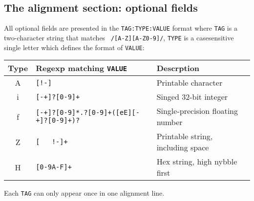 \documentclass[10pt]{article}
\begin{document}
\subsection{The alignment section: optional fields}
All optional fields are presented in the {\tt TAG:TYPE:VALUE} format
where {\tt TAG} is a two-character string that matches {\tt
  /[A-Z][A-Z0-9]/}, {\tt TYPE} is a casesensitive single letter which
defines the format of {\tt VALUE}:
\begin{center}\small
\begin{tabular}{cll}
\hline
{\bf Type} & {\bf Regexp matching {\tt VALUE}} & {\bf Descrption} \\
\hline
A & {\tt [!-\char126]} & Printable character \\
i & {\tt [-+]?[0-9]+} & Singed 32-bit integer \\
f & {\tt [-+]?[0-9]*\char92.?[0-9]+([eE][-+]?[0-9]+)?} & Single-precision floating number \\
Z & {\tt [\,\,\,!-\char126]+} & Printable string, including space\\
H & {\tt [0-9A-F]+} & Hex string, high nybble first \\
\hline
\end{tabular}
\end{center}
Each {\tt TAG} can only appear once in one alignment line.
\end{document}
